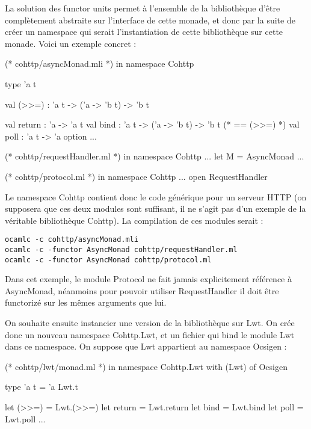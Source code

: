 \documentclass[11pt,a4paper]{report}
\begin{document}
La solution des functor units permet à l'ensemble de la bibliothèque d'être
complètement abstraite sur l'interface de cette monade, et donc par la suite de
créer un namespace qui serait l'instantiation de cette bibliothèque sur cette
monade. Voici un exemple concret :

\begin{OCaml}
(* cohttp/asyncMonad.mli *)
in namespace Cohttp

type 'a t

val (>>=) : 'a t -> ('a -> 'b t) -> 'b t

val return : 'a -> 'a t
val bind : 'a t -> ('a -> 'b t) -> 'b t (* == (>>=) *)
val poll : 'a t -> 'a option
...
\end{OCaml}

\begin{OCaml}
(* cohttp/requestHandler.ml *)
in namespace Cohttp
...
let M = AsyncMonad
...
\end{OCaml}

\begin{OCaml}
(* cohttp/protocol.ml *)
in namespace Cohttp
...
open RequestHandler
\end{OCaml}

Le namespace Cohttp contient donc le code générique pour un serveur HTTP (on
supposera que ces deux modules sont suffisant, il ne s'agit pas d'un exemple de
la véritable bibliothèque Cohttp). La compilation de ces modules serait :
\begin{verbatim}
ocamlc -c cohttp/asyncMonad.mli
ocamlc -c -functor AsyncMonad cohttp/requestHandler.ml
ocamlc -c -functor AsyncMonad cohttp/protocol.ml
\end{verbatim}

Dans cet exemple, le module Protocol ne fait jamais explicitement référence à
AsyncMonad, néanmoins pour pouvoir utiliser RequestHandler il doit être
functorizé sur les mêmes arguments que lui.

On souhaite ensuite instancier une version de la bibliothèque sur Lwt. On crée
donc un nouveau namespace Cohttp.Lwt, et un fichier qui bind le module Lwt dans
ce namespace. On suppose que Lwt appartient au namespace Ocsigen :
\begin{OCaml}
(* cohttp/lwt/monad.ml *)
in namespace Cohttp.Lwt
with (Lwt) of Ocsigen

type 'a t = 'a Lwt.t

let (>>=) = Lwt.(>>=)
let return = Lwt.return
let bind = Lwt.bind
let poll = Lwt.poll
...
\end{OCaml} 
\end{document}
